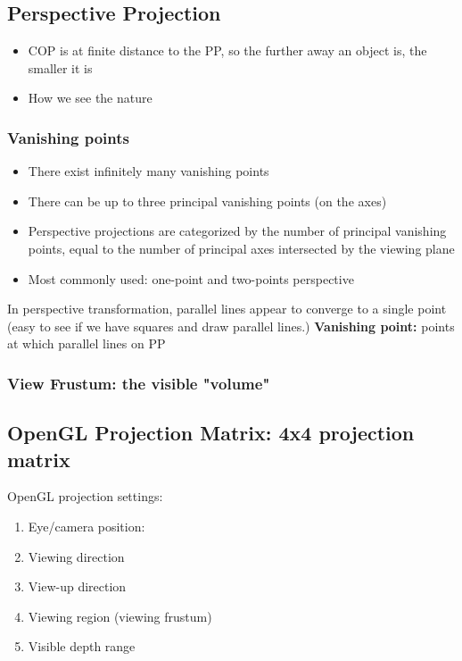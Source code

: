 \documentclass[11pt]{article}
\begin{document}
\subsection{Perspective Projection}
\begin{itemize}
    \item COP is at finite distance to the PP, so the further away an object is, the smaller it is
    \item How we see the nature
\end{itemize}

\subsubsection*{Vanishing points}
\begin{itemize}
    \item There exist infinitely many vanishing points
    \item There can be up to three principal vanishing points (on the axes)
    \item Perspective projections are categorized by the number of principal vanishing points, equal to the number of principal axes intersected by the viewing plane
    \item Most commonly used: one-point and two-points perspective
\end{itemize}

In perspective transformation, parallel lines appear to converge to a single point (easy to see if we have squares and draw parallel lines.)\newline
\textbf{Vanishing point: } points at which parallel lines on PP  

\subsubsection*{View Frustum: the visible "volume" }

\subsection{OpenGL Projection Matrix: 4x4 projection matrix}
OpenGL projection settings:
\begin{enumerate}
    \item Eye/camera position:
    \item Viewing direction
    \item View-up direction
    \item Viewing region (viewing frustum)
    \item Visible depth range
\end{enumerate}
\end{document}
